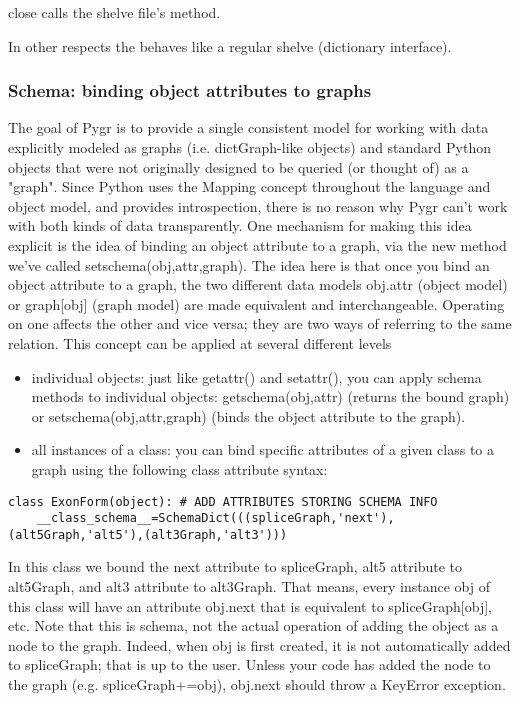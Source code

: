 \documentclass{howto}
\begin{document}
\begin{funcdesc}{close}{}
  calls the shelve file's  method.
\end{funcdesc}
In other respects the  behaves like a regular shelve
(dictionary interface).

\subsubsection{Schema: binding object attributes to graphs}

The goal of Pygr is to provide a single consistent model for working with data explicitly modeled as graphs (i.e. dictGraph-like objects) and standard Python objects that were not originally designed to be queried (or thought of) as a "graph".  Since Python uses the Mapping concept throughout the language and object model, and provides introspection, there is no reason why Pygr can't work with both kinds of data transparently.  One mechanism for making this idea explicit is the idea of binding an object attribute to a graph, via the new method we've called setschema(obj,attr,graph).  The idea here is that once you bind an object attribute to a graph, the two different data models obj.attr (object model) or graph[obj] (graph model) are made equivalent and interchangeable.  Operating on one affects the other and vice versa; they are two ways of referring to the same relation.  This concept can be applied at several different levels

\begin{itemize}
\item
individual objects: just like getattr() and setattr(), you can apply schema methods to individual objects: getschema(obj,attr) (returns the bound graph) or setschema(obj,attr,graph) (binds the object attribute to the graph). 

\item
all instances of a class: you can bind specific attributes of a given class to a graph using the following class attribute syntax:

\end{itemize}
\begin{verbatim}
class ExonForm(object): # ADD ATTRIBUTES STORING SCHEMA INFO
    __class_schema__=SchemaDict(((spliceGraph,'next'),(alt5Graph,'alt5'),(alt3Graph,'alt3')))
\end{verbatim}

In this class we bound the next attribute to spliceGraph, alt5 attribute to alt5Graph, and alt3 attribute to alt3Graph.  That means, every instance obj of this class will have an attribute obj.next that is equivalent to spliceGraph[obj], etc.  Note that this is schema, not the actual operation of adding the object as a node to the graph.  Indeed, when obj is first created, it is not automatically added to spliceGraph; that is up to the user.  Unless your code has added the node to the graph (e.g. spliceGraph+=obj), obj.next should throw a KeyError exception.
\end{document}
